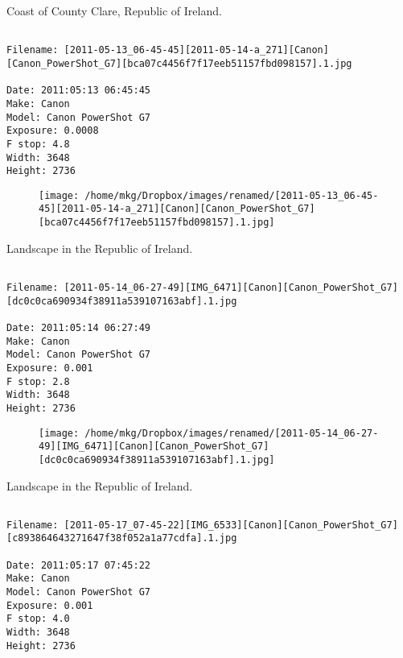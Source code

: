 \clearpage
\onecolumn
\noindent Coast of County Clare, Republic of Ireland.
\noindent
\begin{lstlisting}

Filename: [2011-05-13_06-45-45][2011-05-14-a_271][Canon][Canon_PowerShot_G7][bca07c4456f7f17eeb51157fbd098157].1.jpg

Date: 2011:05:13 06:45:45
Make: Canon
Model: Canon PowerShot G7
Exposure: 0.0008
F stop: 4.8
Width: 3648
Height: 2736
\end{lstlisting}
\clearpage

\begin{figure}
\texttt{[image: /home/mkg/Dropbox/images/renamed/[2011-05-13\_06-45-45][2011-05-14-a\_271][Canon][Canon\_PowerShot\_G7][bca07c4456f7f17eeb51157fbd098157].1.jpg]}
\end{figure}
    
\clearpage
\onecolumn
\noindent Landscape in the Republic of Ireland.
\noindent
\begin{lstlisting}

Filename: [2011-05-14_06-27-49][IMG_6471][Canon][Canon_PowerShot_G7][dc0c0ca690934f38911a539107163abf].1.jpg

Date: 2011:05:14 06:27:49
Make: Canon
Model: Canon PowerShot G7
Exposure: 0.001
F stop: 2.8
Width: 3648
Height: 2736
\end{lstlisting}
\clearpage

\begin{figure}
\texttt{[image: /home/mkg/Dropbox/images/renamed/[2011-05-14\_06-27-49][IMG\_6471][Canon][Canon\_PowerShot\_G7][dc0c0ca690934f38911a539107163abf].1.jpg]}
\end{figure}
    
\clearpage
\onecolumn
\noindent Landscape in the Republic of Ireland.
\noindent
\begin{lstlisting}

Filename: [2011-05-17_07-45-22][IMG_6533][Canon][Canon_PowerShot_G7][c893864643271647f38f052a1a77cdfa].1.jpg

Date: 2011:05:17 07:45:22
Make: Canon
Model: Canon PowerShot G7
Exposure: 0.001
F stop: 4.0
Width: 3648
Height: 2736
\end{lstlisting}
\clearpage

